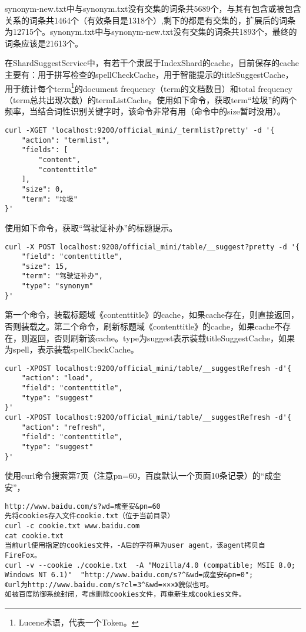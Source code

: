 \par synonym-new.txt中与synonym.txt没有交集的词条共5689个，与其有包含或被包含关系的词条共1464个（有效条目是1318个）,剩下的都是有交集的，扩展后的词条为12715个。synonym.txt中与synonym-new.txt没有交集的词条共1893个，最终的词条应该是21613个。
\par 在ShardSuggestService中，有若干个隶属于IndexShard的cache，目前保存的cache主要有：用于拼写检查的spellCheckCache，用于智能提示的titleSuggestCache，用于统计每个term\footnote{Lucene术语，代表一个Token。}的document frequency（term的文档数目）和total frequency（term总共出现次数）的termListCache。使用如下命令，获取term“垃圾”的两个频率，当结合词性识别关键字时，该命令非常有用（命令中的size暂时没用）。
\begin{verbatim}
curl -XGET 'localhost:9200/official_mini/_termlist?pretty' -d '{
    "action": "termlist", 
    "fields": [
        "content", 
        "contenttitle"
    ], 
    "size": 0, 
    "term": "垃圾"
}'
\end{verbatim}
\par 使用如下命令，获取“驾驶证补办”的标题提示。
\begin{verbatim}
curl -X POST localhost:9200/official_mini/table/__suggest?pretty -d '{
    "field": "contenttitle", 
    "size": 15, 
    "term": "驾驶证补办", 
    "type": "synonym"
}'
\end{verbatim}
\par 第一个命令，装载标题域《contenttitle》的cache，如果cache存在，则直接返回，否则装载之。第二个命令，刷新标题域《contenttitle》的cache，如果cache不存在，则返回，否则刷新该cache。type为suggest表示装载titleSuggestCache，如果为spell，表示装载spellCheckCache。
\begin{verbatim}
curl -XPOST localhost:9200/official_mini/table/__suggestRefresh -d'{
    "action": "load", 
    "field": "contenttitle", 
    "type": "suggest"
}'
curl -XPOST localhost:9200/official_mini/table/__suggestRefresh -d'{   
    "action": "refresh", 
    "field": "contenttitle", 
    "type": "suggest"
}'
\end{verbatim}
\par 使用curl命令搜索第7页（注意pn=60，百度默认一个页面10条记录）的“成奎安”，
\begin{verbatim}
http://www.baidu.com/s?wd=成奎安&pn=60
先将cookies存入文件cookie.txt（位于当前目录）
curl -c cookie.txt www.baidu.com
cat cookie.txt
当前url使用指定的cookies文件，-A后的字符串为user agent，该agent拷贝自FireFox。
curl -v --cookie ./cookie.txt  -A "Mozilla/4.0 (compatible; MSIE 8.0; Windows NT 6.1)"  "http://www.baidu.com/s?^&wd=成奎安&pn=0";
《url为http://www.baidu.com/s?cl=3^&wd=×××》貌似也可。
如被百度防御系统封闭，考虑删除cookies文件，再重新生成cookies文件。
\end{verbatim}
